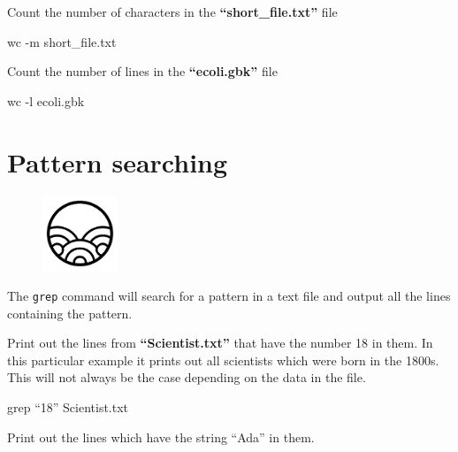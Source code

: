 \documentclass[
  letterpaper,
  DIV=11,
  numbers=noendperiod]{scrreprt}
\newenvironment{Shaded}{\begin{snugshade}}{\end{snugshade}}
\newcommand{\AttributeTok}[1]{\textcolor[rgb]{0.40,0.45,0.13}{#1}}
\newcommand{\FunctionTok}[1]{\textcolor[rgb]{0.28,0.35,0.67}{#1}}
\newcommand{\NormalTok}[1]{\textcolor[rgb]{0.00,0.23,0.31}{#1}}
\begin{document}
Count the number of characters in the \textbf{``short\_file.txt''} file

\begin{Shaded}
\begin{Highlighting}[]
\FunctionTok{wc} \AttributeTok{{-}m}\NormalTok{ short\_file.txt}
\end{Highlighting}
\end{Shaded}

Count the number of lines in the \textbf{``ecoli.gbk''} file

\begin{Shaded}
\begin{Highlighting}[]
\FunctionTok{wc} \AttributeTok{{-}l}\NormalTok{ ecoli.gbk}
\end{Highlighting}
\end{Shaded}

\hypertarget{pattern-searching}{%
\section{Pattern searching}\label{pattern-searching}}

\begin{figure}

{\centering \includegraphics[width=0.2\textwidth,height=\textheight]{figures/pattern.png}

}

\end{figure}

The \texttt{grep} command will search for a pattern in a text file and
output all the lines containing the pattern.

Print out the lines from \textbf{``Scientist.txt''} that have the number
18 in them. In this particular example it prints out all scientists
which were born in the 1800s. This will not always be the case depending
on the data in the file.

\begin{Shaded}
\begin{Highlighting}[]
\FunctionTok{grep}\NormalTok{ “18” Scientist.txt}
\end{Highlighting}
\end{Shaded}

Print out the lines which have the string ``Ada'' in them.
\end{document}
